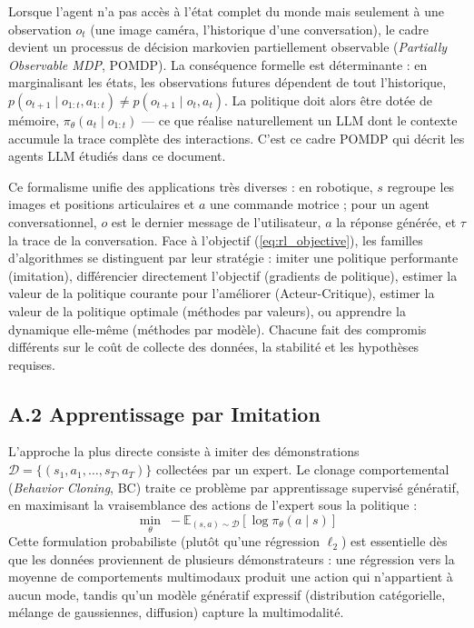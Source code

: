 \documentclass[11pt,a4paper]{article}
\begin{document}
Lorsque l'agent n'a pas accès à l'état complet du monde mais seulement à une observation $o_t$ (une image caméra, l'historique d'une conversation), le cadre devient un processus de décision markovien partiellement observable (\emph{Partially Observable MDP}, POMDP). La conséquence formelle est déterminante : en marginalisant les états, les observations futures dépendent de tout l'historique, $p(o_{t+1} \mid o_{1:t}, a_{1:t}) \neq p(o_{t+1} \mid o_t, a_t)$. La politique doit alors être dotée de mémoire, $\pi_\theta(a_t \mid o_{1:t})$ — ce que réalise naturellement un LLM dont le contexte accumule la trace complète des interactions. C'est ce cadre POMDP qui décrit les agents LLM étudiés dans ce document.

Ce formalisme unifie des applications très diverses : en robotique, $s$ regroupe les images et positions articulaires et $a$ une commande motrice ; pour un agent conversationnel, $o$ est le dernier message de l'utilisateur, $a$ la réponse générée, et $\tau$ la trace de la conversation. Face à l'objectif (\ref{eq:rl_objective}), les familles d'algorithmes se distinguent par leur stratégie : imiter une politique performante (imitation), différencier directement l'objectif (gradients de politique), estimer la valeur de la politique courante pour l'améliorer (Acteur-Critique), estimer la valeur de la politique optimale (méthodes par valeurs), ou apprendre la dynamique elle-même (méthodes par modèle). Chacune fait des compromis différents sur le coût de collecte des données, la stabilité et les hypothèses requises.

\subsection*{A.2 Apprentissage par Imitation}
L'approche la plus directe consiste à imiter des démonstrations $\mathcal{D} = \{(s_1, a_1, \dots, s_T, a_T)\}$ collectées par un expert. Le clonage comportemental (\emph{Behavior Cloning}, BC) traite ce problème par apprentissage supervisé génératif, en maximisant la vraisemblance des actions de l'expert sous la politique :
\begin{equation}
\min_\theta \; -\mathbb{E}_{(s,a) \sim \mathcal{D}} \left[ \log \pi_\theta(a \mid s) \right]
\label{eq:bc}
\end{equation}
Cette formulation probabiliste (plutôt qu'une régression $\ell_2$) est essentielle dès que les données proviennent de plusieurs démonstrateurs : une régression vers la moyenne de comportements multimodaux produit une action qui n'appartient à aucun mode, tandis qu'un modèle génératif expressif (distribution catégorielle, mélange de gaussiennes, diffusion) capture la multimodalité.
\end{document}
